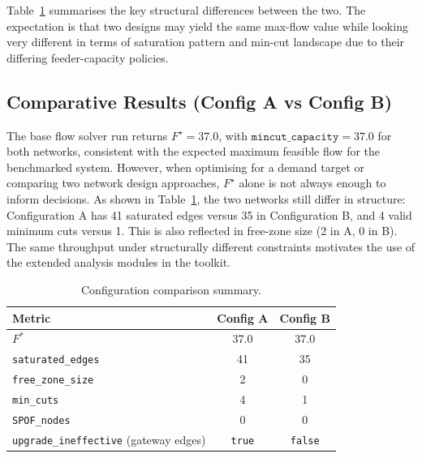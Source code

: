 \documentclass[12pt]{report}
\begin{document}
Table~\ref{tab:config_comparison} summarises the key structural differences between the two. The expectation is that two designs may yield the same max-flow value while looking very different in terms of saturation pattern and min-cut landscape due to their differing feeder-capacity policies.



\subsection{Comparative Results (Config A vs Config B)}

The base flow solver run returns $F^\star = 37.0$, with $\texttt{mincut\_capacity} = 37.0$ for both networks, consistent with the expected maximum feasible flow for the benchmarked system. However, when optimising for a demand target or comparing two network design approaches, $F^\star$ alone is not always enough to inform decisions. As shown in Table~\ref{tab:config_comparison}, the two networks still differ in structure: Configuration A has 41 saturated edges versus 35 in Configuration B, and 4 valid minimum cuts versus 1. This is also reflected in free-zone size (2 in A, 0 in B). The same throughput under structurally different constraints motivates the use of the extended analysis modules in the toolkit.

\begin{table}[htbp]
\centering
\caption{Configuration comparison summary.}
\label{tab:config_comparison}
\begin{tabular}{lcc}
\toprule
Metric & Config A & Config B \\
\midrule
$F^*$                                        & 37.0           & 37.0           \\
\texttt{saturated\_edges}                    & 41             & 35             \\
\texttt{free\_zone\_size}                    & 2              & 0              \\
\texttt{min\_cuts}                           & 4              & 1              \\
\texttt{SPOF\_nodes}                         & 0              & 0              \\
\texttt{upgrade\_ineffective} (gateway edges) & \texttt{true} & \texttt{false} \\
\bottomrule
\end{tabular}
\end{table}
\end{document}
